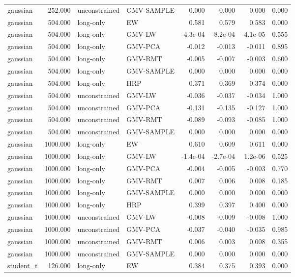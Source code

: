 \begin{table}[t]
{\begin{tabular}{lrllrrrr}
gaussian & 252.000 & unconstrained & GMV-SAMPLE & 0.000 & 0.000 & 0.000 & 0.000 \\
gaussian & 504.000 & long-only & EW & 0.581 & 0.579 & 0.583 & 0.000 \\
gaussian & 504.000 & long-only & GMV-LW & -4.3e-04 & -8.2e-04 & -4.1e-05 & 0.555 \\
gaussian & 504.000 & long-only & GMV-PCA & -0.012 & -0.013 & -0.011 & 0.895 \\
gaussian & 504.000 & long-only & GMV-RMT & -0.005 & -0.007 & -0.003 & 0.600 \\
gaussian & 504.000 & long-only & GMV-SAMPLE & 0.000 & 0.000 & 0.000 & 0.000 \\
gaussian & 504.000 & long-only & HRP & 0.371 & 0.369 & 0.374 & 0.000 \\
gaussian & 504.000 & unconstrained & GMV-LW & -0.036 & -0.037 & -0.034 & 1.000 \\
gaussian & 504.000 & unconstrained & GMV-PCA & -0.131 & -0.135 & -0.127 & 1.000 \\
gaussian & 504.000 & unconstrained & GMV-RMT & -0.089 & -0.093 & -0.085 & 1.000 \\
gaussian & 504.000 & unconstrained & GMV-SAMPLE & 0.000 & 0.000 & 0.000 & 0.000 \\
gaussian & 1000.000 & long-only & EW & 0.610 & 0.609 & 0.611 & 0.000 \\
gaussian & 1000.000 & long-only & GMV-LW & -1.4e-04 & -2.7e-04 & 1.2e-06 & 0.525 \\
gaussian & 1000.000 & long-only & GMV-PCA & -0.004 & -0.005 & -0.003 & 0.770 \\
gaussian & 1000.000 & long-only & GMV-RMT & 0.007 & 0.006 & 0.008 & 0.185 \\
gaussian & 1000.000 & long-only & GMV-SAMPLE & 0.000 & 0.000 & 0.000 & 0.000 \\
gaussian & 1000.000 & long-only & HRP & 0.399 & 0.397 & 0.400 & 0.000 \\
gaussian & 1000.000 & unconstrained & GMV-LW & -0.008 & -0.009 & -0.008 & 1.000 \\
gaussian & 1000.000 & unconstrained & GMV-PCA & -0.037 & -0.040 & -0.035 & 0.985 \\
gaussian & 1000.000 & unconstrained & GMV-RMT & 0.006 & 0.003 & 0.008 & 0.355 \\
gaussian & 1000.000 & unconstrained & GMV-SAMPLE & 0.000 & 0.000 & 0.000 & 0.000 \\
student\_t & 126.000 & long-only & EW & 0.384 & 0.375 & 0.393 & 0.000 \\

\end{tabular}}
\end{table}
